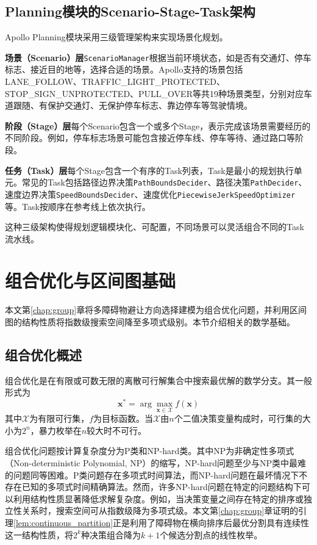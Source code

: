 \subsection{Planning模块的Scenario-Stage-Task架构}

Apollo Planning模块采用三级管理架构来实现场景化规划。

\textbf{场景（Scenario）层}\quad{}\texttt{ScenarioManager}根据当前环境状态，如是否有交通灯、停车标志、接近目的地等，选择合适的场景。Apollo支持的场景包括LANE\_FOLLOW、TRAFFIC\_LIGHT\_PROTECTED、STOP\_SIGN\_UNPROTECTED、PULL\_OVER等共19种场景类型，分别对应车道跟随、有保护交通灯、无保护停车标志、靠边停车等驾驶情境。

\textbf{阶段（Stage）层}\quad{}每个Scenario包含一个或多个Stage，表示完成该场景需要经历的不同阶段。例如，停车标志场景可能包含接近停车线、停车等待、通过路口等阶段。

\textbf{任务（Task）层}\quad{}每个Stage包含一个有序的Task列表，Task是最小的规划执行单元。常见的Task包括路径边界决策\texttt{PathBoundsDecider}、路径决策\texttt{PathDecider}、速度边界决策\texttt{SpeedBoundsDecider}、速度优化\texttt{PiecewiseJerkSpeedOptimizer}等。Task按顺序在参考线上依次执行。

这种三级架构使得规划逻辑模块化、可配置，不同场景可以灵活组合不同的Task流水线。

\section{组合优化与区间图基础}

本文第\ref{chap:group}章将多障碍物避让方向选择建模为组合优化问题，并利用区间图的结构性质将指数级搜索空间降至多项式级别。本节介绍相关的数学基础。

\subsection{组合优化概述}

组合优化是在有限或可数无限的离散可行解集合中搜索最优解的数学分支。其一般形式为
\begin{equation}
\mathbf{x}^{*} = \arg\max_{\mathbf{x} \in \mathcal{X}} f(\mathbf{x})
\label{eq:combo_opt}
\end{equation}
其中$\mathcal{X}$为有限可行集，$f$为目标函数。当$\mathcal{X}$由$n$个二值决策变量构成时，可行集的大小为$2^n$，暴力枚举在$n$较大时不可行。

组合优化问题按计算复杂度分为P类和NP-hard类。其中NP为非确定性多项式（Non-deterministic Polynomial, NP）的缩写，NP-hard问题至少与NP类中最难的问题同等困难。P类问题存在多项式时间算法，而NP-hard问题在最坏情况下不存在已知的多项式时间精确算法。然而，许多NP-hard问题在特定的问题结构下可以利用结构性质显著降低求解复杂度。例如，当决策变量之间存在特定的排序或独立性关系时，搜索空间可从指数级降为多项式级。本文第\ref{chap:group}章证明的引理\ref{lem:continuous_partition}正是利用了障碍物在横向排序后最优分割具有连续性这一结构性质，将$2^k$种决策组合降为$k+1$个候选分割点的线性枚举。

